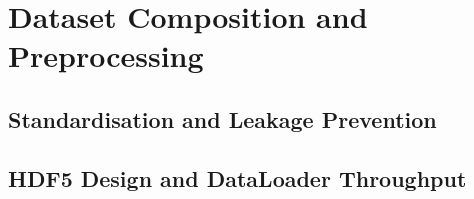 \section{Dataset Composition and Preprocessing}
\subsection{Standardisation and Leakage Prevention}
\subsection{HDF5 Design and DataLoader Throughput}
